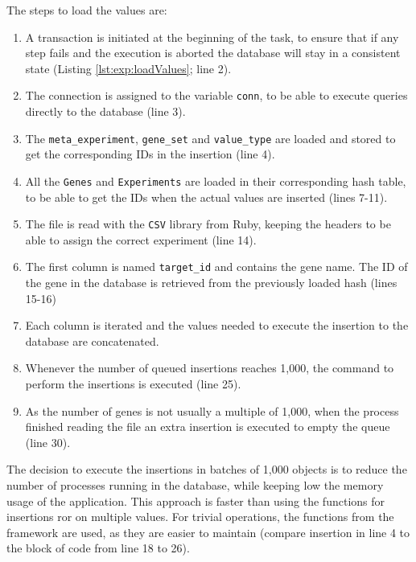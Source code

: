 The steps to load the values are:
\begin{enumerate}
\item A transaction is initiated at the beginning of the task, to ensure that if any step fails and the execution is aborted the database will stay in a consistent state (Listing \ref{lst:exp:loadValues}; line 2).
\item The connection is assigned to the variable \verb|conn|, to be able to execute queries directly to the database (line 3).   
\item The \verb|meta_experiment|, \verb|gene_set| and \verb|value_type| are loaded and stored to get the corresponding IDs in the insertion (line 4).
\item All the \verb|Genes| and \verb|Experiments| are loaded in their corresponding hash table, to be able to get the IDs when the actual values are inserted (lines 7-11). 
\item The file is read with the \verb|CSV| library from Ruby, keeping the headers to be able to assign the correct experiment (line 14). 
\item The first column is named \verb|target_id| and contains the gene name. The ID of the gene  in the database is retrieved from the previously loaded hash (lines 15-16)
\item Each column is iterated and the values needed to execute the insertion to the database are concatenated. 
\item Whenever the number of queued insertions reaches 1,000, the command to perform the insertions is executed (line 25). 
\item As the number of genes is not usually a multiple of 1,000, when the process finished reading the file an extra insertion is executed to empty the queue (line 30).
\end{enumerate}

The decision to execute the insertions in batches of 1,000 objects is to reduce the number of processes running in the database, while keeping low the memory usage of the application. 
This approach is faster than using the functions for insertions \acrshort{ror} on multiple values. 
For trivial operations, the functions from the framework are used, as they are easier to maintain (compare insertion in line 4 to the block of code from line 18 to 26). 

